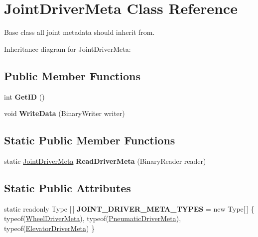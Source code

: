 \hypertarget{class_joint_driver_meta}{}\section{Joint\+Driver\+Meta Class Reference}
\label{class_joint_driver_meta}


Base class all joint metadata should inherit from.  




Inheritance diagram for Joint\+Driver\+Meta\+:
\subsection*{Public Member Functions}
\begin{DoxyCompactItemize}
\item 
\mbox{\label{class_joint_driver_meta_ab05346b958156ad0cbb9f908c19fa838}} 
int {\bfseries Get\+ID} ()
\item 
\mbox{\label{class_joint_driver_meta_ac4b1c493843d20020a1ed43714c966c2}} 
void {\bfseries Write\+Data} (Binary\+Writer writer)
\end{DoxyCompactItemize}
\subsection*{Static Public Member Functions}
\begin{DoxyCompactItemize}
\item 
\mbox{\label{class_joint_driver_meta_adb75866d97a7f8b57f95cc5581e62860}} 
static \hyperlink{class_joint_driver_meta}{Joint\+Driver\+Meta} {\bfseries Read\+Driver\+Meta} (Binary\+Reader reader)
\end{DoxyCompactItemize}
\subsection*{Static Public Attributes}
\begin{DoxyCompactItemize}
\item 
\mbox{\label{class_joint_driver_meta_aca600ea13be10ec808f61deee5f559f9}} 
static readonly Type \mbox{[}$\,$\mbox{]} {\bfseries J\+O\+I\+N\+T\+\_\+\+D\+R\+I\+V\+E\+R\+\_\+\+M\+E\+T\+A\+\_\+\+T\+Y\+P\+ES} = new Type\mbox{[}$\,$\mbox{]} \{ typeof(\hyperlink{class_wheel_driver_meta}{Wheel\+Driver\+Meta}), typeof(\hyperlink{class_pneumatic_driver_meta}{Pneumatic\+Driver\+Meta}), typeof(\hyperlink{class_elevator_driver_meta}{Elevator\+Driver\+Meta}) \}
\end{DoxyCompactItemize}
